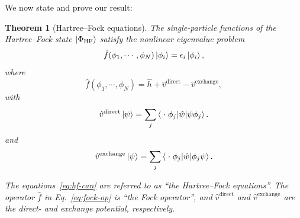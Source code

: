 \documentclass{report}
\theoremstyle{plain}
\newtheorem{theorem}{Theorem}[chapter]
\theoremstyle{definition}
\begin{document}
We now state and prove our result:
\begin{theorem}[Hartree--Fock equations]
  The single-particle functions of the Hartree--Fock state
  $\ket{\Phi_\text{HF}}$ satisfy
  the nonlinear eigenvalue problem
  \begin{equation}
    \hat{f}(\phi_1,\cdots,\phi_N)\ket{\phi_i} = \epsilon_i
    \ket{\phi_i}, \label{eq:hf-can}
  \end{equation}
  where
  \begin{equation}
    \hat{f}(\phi_1,\cdots,\phi_N) = \hat{h} + \hat{v}^\text{direct}
     - \hat{v}^\text{exchange},\label{eq:fock-op}
  \end{equation}
  with
  \begin{equation}
    \hat{v}^\text{direct}\ket{\psi} = \sum_j \braket{\; \cdot \;
      \phi_j|\hat{w}|\psi\phi_j}. \label{eq:direct}
  \end{equation}
  and
  \begin{equation}
    \hat{v}^\text{exchange}\ket{\psi} = \sum_j \braket{\; \cdot \;
      \phi_j|\hat{w}|\phi_j\psi}. \label{eq:exchange}
  \end{equation}

  The equations~\eqref{eq:hf-can} are
  referred to as ``the Hartree--Fock equations''. The operator
  $\hat{f}$ in Eq.~\eqref{eq:fock-op} is ``the Fock operator'', and
  $\hat{v}^\text{direct}$ and $\hat{v}^\text{exchange}$ are the direct-
  and exchange potential, respectively.
\end{theorem}
\end{document}
